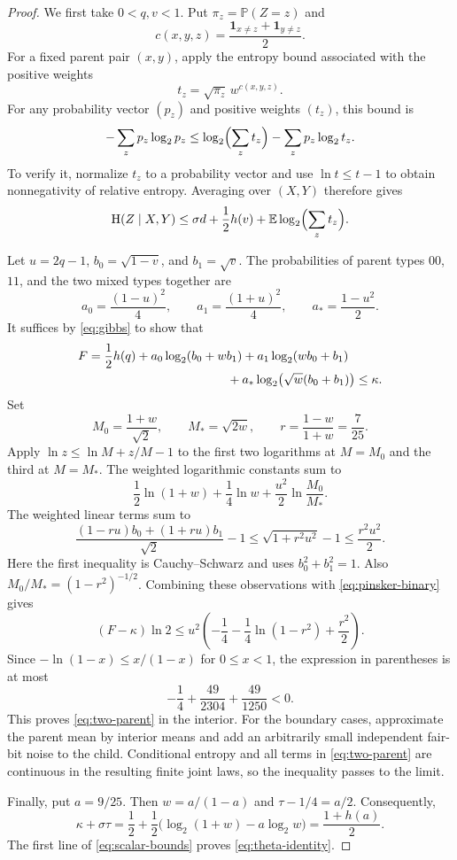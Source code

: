 \documentclass[11pt,leqno]{amsart}
\numberwithin{equation}{section}
\theoremstyle{definition}
\theoremstyle{remark}
\newcommand{\E}{\mathbb E}
\newcommand{\Prob}{\mathbb P}
\newcommand{\one}{\mathbf 1}
\newcommand{\HH}{\mathrm H}
\begin{document}
\begin{proof}
We first take $0<q,v<1$. Put $\pi_z=\Prob(Z=z)$ and
\[
 c(x,y,z)=\frac{\one_{x\ne z}+\one_{y\ne z}}2.
\]
For a fixed parent pair $(x,y)$, apply the entropy bound associated with the positive weights
\[
 t_z=\sqrt{\pi_z}\,w^{c(x,y,z)}.
\]
For any probability vector $(p_z)$ and positive weights $(t_z)$, this bound is
\[
 -\sum_zp_z\log_2p_z
 \le\log_2\Bigl(\sum_zt_z\Bigr)-\sum_zp_z\log_2t_z.
\]
To verify it, normalize $t_z$ to a probability vector and use $\ln t\le t-1$ to obtain nonnegativity of relative entropy. Averaging over $(X,Y)$ therefore gives
\begin{equation}\label{eq:gibbs}
 \HH(Z\mid X,Y)
 \le \sigma d+\frac12h(v)+\E\log_2\Bigl(\sum_z t_z\Bigr).
\end{equation}

Let $u=2q-1$, $b_0=\sqrt{1-v}$, and $b_1=\sqrt v$. The probabilities of parent types $00$, $11$, and the two mixed types together are
\[
 a_0=\frac{(1-u)^2}4,\qquad
 a_1=\frac{(1+u)^2}4,\qquad
 a_* =\frac{1-u^2}2.
\]
It suffices by \eqref{eq:gibbs} to show that
\begin{align*}
 F={}&\frac12h(q)
 +a_0\log_2(b_0+w b_1)
 +a_1\log_2(w b_0+b_1)\\
 &\hspace{35mm}+a_*\log_2\bigl(\sqrt w(b_0+b_1)\bigr)
 \le\kappa.
\end{align*}
Set
\[
 M_0=\frac{1+w}{\sqrt2},\qquad
 M_* =\sqrt{2w},\qquad
 r=\frac{1-w}{1+w}=\frac7{25}.
\]
Apply $\ln z\le\ln M+z/M-1$ to the first two logarithms at $M=M_0$ and the third at $M=M_*$. The weighted logarithmic constants sum to
\[
 \frac12\ln(1+w)+\frac14\ln w
 +\frac{u^2}2\ln\frac{M_0}{M_*}.
\]
The weighted linear terms sum to
\[
 \frac{(1-ru)b_0+(1+ru)b_1}{\sqrt2}-1
 \le\sqrt{1+r^2u^2}-1\le\frac{r^2u^2}2.
\]
Here the first inequality is Cauchy--Schwarz and uses $b_0^2+b_1^2=1$. Also $M_0/M_*=(1-r^2)^{-1/2}$. Combining these observations with \eqref{eq:pinsker-binary} gives
\begin{equation}\label{eq:entropy-bracket}
 (F-\kappa)\ln2
 \le u^2\left(-\frac14-\frac14\ln(1-r^2)+\frac{r^2}2\right).
\end{equation}
Since $-\ln(1-x)\le x/(1-x)$ for $0\le x<1$, the expression in parentheses is at most
\[
 -\frac14+\frac{49}{2304}+\frac{49}{1250}<0.
\]
This proves \eqref{eq:two-parent} in the interior. For the boundary cases, approximate the parent mean by interior means and add an arbitrarily small independent fair-bit noise to the child. Conditional entropy and all terms in \eqref{eq:two-parent} are continuous in the resulting finite joint laws, so the inequality passes to the limit.

Finally, put $a=9/25$. Then $w=a/(1-a)$ and $\tau-1/4=a/2$. Consequently,
\[
 \kappa+\sigma\tau
 =\frac12+\frac12\bigl(\log_2(1+w)-a\log_2 w\bigr)
 =\frac{1+h(a)}2.
\]
The first line of \eqref{eq:scalar-bounds} proves \eqref{eq:theta-identity}.
\end{proof}
\end{document}
